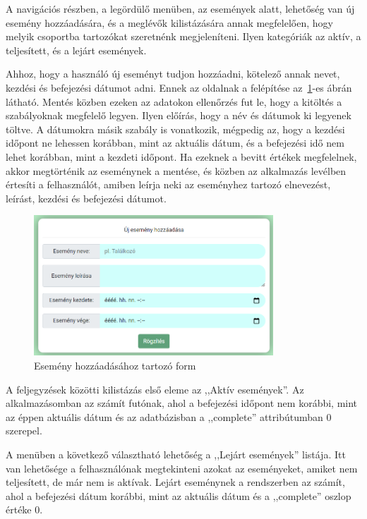 \documentclass[
]{thesis-ekf}
\theoremstyle{definition}
\theoremstyle{remark}
\begin{document}
	A navigációs részben, a legördülő menüben, az események alatt, lehetőség van új esemény hozzáadására, és a meglévők kilistázására annak megfelelően, hogy melyik csoportba tartozókat szeretnénk megjeleníteni. Ilyen kategóriák az aktív, a teljesített, és a lejárt események. 
	
	Ahhoz, hogy a használó új eseményt tudjon hozzáadni, kötelező annak nevet, kezdési és befejezési dátumot adni. Ennek az oldalnak a felépítése az~\ref{figure:web_add_event}-es ábrán látható. Mentés közben ezeken az adatokon ellenőrzés fut le, hogy a kitöltés a szabályoknak megfelelő legyen. Ilyen előírás, hogy a név és dátumok ki legyenek töltve. A dátumokra másik szabály is vonatkozik, mégpedig az, hogy a kezdési időpont ne lehessen korábban, mint az aktuális dátum, és a befejezési idő nem lehet korábban, mint a kezdeti időpont. Ha ezeknek a bevitt értékek megfelelnek, akkor megtörténik az eseménynek a mentése, és közben az alkalmazás levélben értesíti a felhasználót, amiben leírja neki az eseményhez tartozó elnevezést, leírást, kezdési és befejezési dátumot. 
	
	\begin{figure}[ht!]
		\centering
		\includegraphics[width=0.8\textwidth]{web_app/web_add_event}
		\caption{Esemény hozzáadásához tartozó form}
		\label{figure:web_add_event}
	\end{figure}
	
	A feljegyzések közötti kilistázás első eleme az ,,Aktív események''. Az alkalmazásomban az számít futónak, ahol a befejezési időpont nem korábbi, mint az éppen aktuális dátum és az adatbázisban a ,,complete''  attribútumban 0 szerepel.
	
	A menüben a következő választható lehetőség a ,,Lejárt események'' listája. Itt van lehetősége a felhasználónak megtekinteni azokat az eseményeket, amiket nem teljesített, de már nem is aktívak. Lejárt eseménynek a rendszerben az számít, ahol a befejezési dátum korábbi, mint az aktuális dátum és a ,,complete'' oszlop értéke 0. 
	
\end{document}
